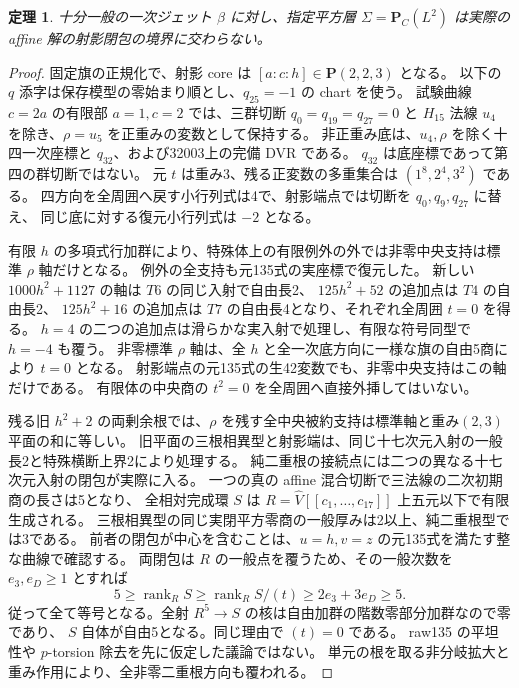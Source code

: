 \documentclass[11pt,a4paper]{ltjsarticle}
\newcommand{\PP}{\mathbf P}
\newtheorem{theorem}{定理}[section]
\theoremstyle{remark}
\begin{document}
\begin{theorem}\label{thm:sigma-full-v62}
十分一般の一次ジェット $\beta$ に対し、指定平方層
$\Sigma=\mathbf P_C(L^2)$ は実際の affine 解の射影閉包の境界に交わらない。
\end{theorem}
\begin{proof}
固定旗の正規化で、射影 core は $[a:c:h]\in\PP(2,2,3)$ となる。
以下の $q$ 添字は保存模型の零始まり順とし、$q_{25}=-1$ の chart を使う。
試験曲線 $c=2a$ の有限部 $a=1,c=2$ では、三群切断 $q_0=q_{19}=q_{27}=0$ と
$H_{15}$ 法線 $u_4$ を除き、$\rho=u_5$ を正重みの変数として保持する。
非正重み底は、$u_4,\rho$ を除く十四一次座標と $q_{32}$、および32003上の完備 DVR である。
$q_{32}$ は底座標であって第四の群切断ではない。
元 $t$ は重み3、残る正変数の多重集合は $(1^8,2^4,3^2)$ である。
四方向を全周囲へ戻す小行列式は4で、射影端点では切断を $q_0,q_9,q_{27}$ に替え、
同じ底に対する復元小行列式は $-2$ となる\cite{sigma-full-v62,sigma-full-review-v62}。

有限 $h$ の多項式行加群により、特殊体上の有限例外の外では非零中央支持は標準 $\rho$ 軸だけとなる。
例外の全支持も元135式の実座標で復元した。
新しい $1000h^2+1127$ の軸は $T6$ の同じ入射で自由長2、
$125h^2+52$ の追加点は $T4$ の自由長2、
$125h^2+16$ の追加点は $T7$ の自由長4となり、それぞれ全周囲 $t=0$ を得る。
$h=4$ の二つの追加点は滑らかな実入射で処理し、有限な符号同型で $h=-4$ も覆う。
非零標準 $\rho$ 軸は、全 $h$ と全一次底方向に一様な旗の自由5商により $t=0$ となる。
射影端点の元135式の生42変数でも、非零中央支持はこの軸だけである。
有限体の中央商の $t^2=0$ を全周囲へ直接外挿してはいない。

残る旧 $h^2+2$ の両剰余根では、$\rho$ を残す全中央被約支持は標準軸と重み$(2,3)$平面の和に等しい。
旧平面の三根相異型と射影端は、同じ十七次元入射の一般長2と特殊横断上界2により処理する。
純二重根の接続点には二つの異なる十七次元入射の閉包が実際に入る。
一つの真の affine 混合切断で三法線の二次初期商の長さは5となり、
全相対完成環 $S$ は $R=\widehat V[[c_1,\ldots,c_{17}]]$ 上五元以下で有限生成される。
三根相異型の同じ実閉平方零商の一般厚みは2以上、純二重根型では3である。
前者の閉包が中心を含むことは、$u=h,v=z$ の元135式を満たす整な曲線で確認する。
両閉包は $R$ の一般点を覆うため、その一般次数を $e_3,e_D\ge1$ とすれば
\[
 5\ge\operatorname{rank}_RS\ge\operatorname{rank}_R S/(t)
     \ge2e_3+3e_D\ge5.
\]
従って全て等号となる。全射 $R^5\to S$ の核は自由加群の階数零部分加群なので零であり、
$S$ 自体が自由5となる。同じ理由で $(t)=0$ である。
raw135 の平坦性や $p$-torsion 除去を先に仮定した議論ではない。
単元の根を取る非分岐拡大と重み作用により、全非零二重根方向も覆われる。


\end{proof}
\end{document}
